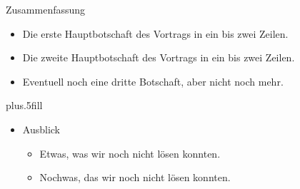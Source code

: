 \documentclass{beamer}
\begin{document}
\begin{frame}{Zusammenfassung}

  \begin{itemize}
  \item
    Die \alert{erste Hauptbotschaft} des Vortrags in ein bis zwei Zeilen.
  \item
    Die \alert{zweite Hauptbotschaft} des Vortrags in ein bis zwei Zeilen.
  \item
    Eventuell noch eine \alert{dritte Botschaft}, aber nicht noch mehr.
  \end{itemize}
  
  \vskip0pt plus.5fill
  \begin{itemize}
  \item
    Ausblick
    \begin{itemize}
    \item
      Etwas, was wir noch nicht lösen konnten.
    \item
      Nochwas, das wir noch nicht lösen konnten.
    \end{itemize}
  \end{itemize}
\end{frame}
\end{document}
